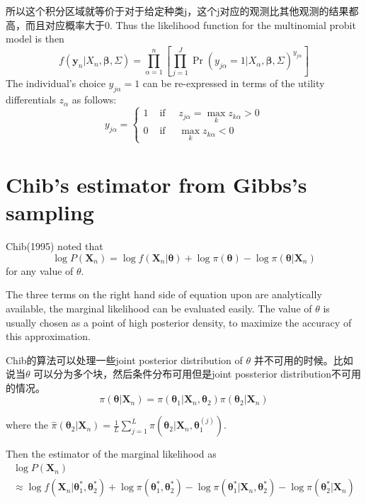 \documentclass[
]{book}
\theoremstyle{definition}
\theoremstyle{definition}
\theoremstyle{definition}
\theoremstyle{remark}
\begin{document}
所以这个积分区域就等价于对于给定种类j，这个j对应的观测比其他观测的结果都高，而且对应概率大于0.
Thus the likelihood function for the multinomial probit model is then
\[
f\left(\boldsymbol{y}_{n} | X_{n}, \boldsymbol{\beta}, \Sigma\right)=\prod_{\alpha=1}^{n}\left[\prod_{j=1}^{J} \operatorname{Pr}\left(y_{j \alpha}=1 | X_{\alpha}, \boldsymbol{\beta}, \Sigma\right)^{y_{j \alpha}}\right]
\]
The individual's choice \(y_{j\alpha}=1\) can be re-expressed in terms of the utility differentials \(z_\alpha\) as follows:
\[
y_{j \alpha}=\left\{\begin{array}{ll}{1} & {\text { if } \quad z_{j \alpha}=\max _{k} z_{k \alpha}>0} \\ {0} & {\text { if } \quad \max _{k} z_{k \alpha}<0}\end{array}\right.
\]

\hypertarget{chibs-estimator-from-gibbss-sampling}{%
\section{Chib's estimator from Gibbs's sampling}\label{chibs-estimator-from-gibbss-sampling}}

Chib(1995) noted that
\[
\log P\left(\boldsymbol{X}_{n}\right)=\log f\left(\boldsymbol{X}_{n} | \boldsymbol{\theta}\right)+\log \pi(\boldsymbol{\theta})-\log \pi\left(\boldsymbol{\theta} | \boldsymbol{X}_{n}\right)
\]
for any value of \(\theta\).

The three terms on the right hand side of equation upon are analytically available, the marginal likelihood can be evaluated easily. The value of \(\theta\) is usually chosen as a point of high posterior density, to maximize the accuracy of this approximation.

Chib的算法可以处理一些joint posterior distribution of \(\theta\) 并不可用的时候。比如说当\(\theta\) 可以分为多个块，然后条件分布可用但是joint possterior distribution不可用的情况。
\[
\pi\left(\boldsymbol{\theta} | \boldsymbol{X}_{n}\right)=\pi\left(\boldsymbol{\theta}_{1} | \boldsymbol{X}_{n}, \boldsymbol{\theta}_{2}\right) \pi\left(\boldsymbol{\theta}_{2} | \boldsymbol{X}_{n}\right)
\]

where the \(\hat{\pi}\left(\boldsymbol{\theta}_{2} | \boldsymbol{X}_{n}\right)=\frac{1}{L} \sum_{j=1}^{L} \pi\left(\boldsymbol{\theta}_{2} | \boldsymbol{X}_{n}, \boldsymbol{\theta}_{1}^{(j)}\right)\).

Then the estimator of the marginal likelihood as
\[
\begin{array}{l}{\log P\left(\boldsymbol{X}_{n}\right)} \\ {\approx \log f\left(\boldsymbol{X}_{n} | \boldsymbol{\theta}_{1}^{*}, \boldsymbol{\theta}_{2}^{*}\right)+\log \pi\left(\boldsymbol{\theta}_{1}^{*}, \boldsymbol{\theta}_{2}^{*}\right)-\log \pi\left(\boldsymbol{\theta}_{1}^{*} | \boldsymbol{X}_{n}, \boldsymbol{\theta}_{2}^{*}\right)-\log \hat{\pi}\left(\boldsymbol{\theta}_{2}^{*} | \boldsymbol{X}_{n}\right)}\end{array}
\]
\end{document}
